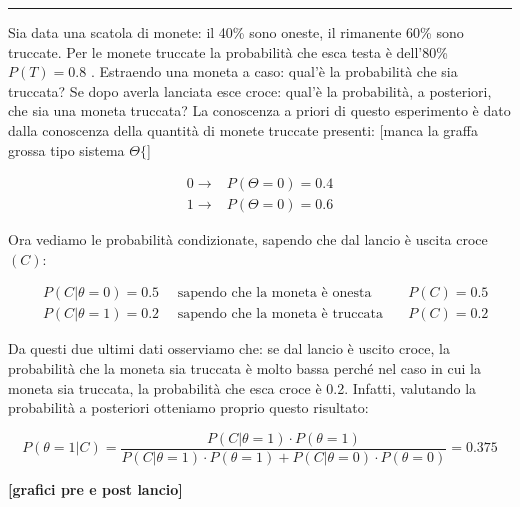 \begin{center} \rule{300pt}{1pt} \end{center}
\begin{esempio}
Sia data una scatola di monete: il 40\% sono oneste, il rimanente 60\% sono truccate. Per le monete truccate la probabilità che esca testa è dell'80\% $P(T)=0.8$ . Estraendo una moneta a caso: qual'è la probabilità che sia truccata? Se dopo averla lanciata esce croce: qual'è la probabilità, a posteriori, che sia una moneta truccata?\newline
La conoscenza a priori di questo esperimento è dato dalla conoscenza della quantità di monete truccate presenti:
[manca la graffa grossa tipo sistema $\Theta \{$]

  \begin{align*}
    0 \rightarrow &P(\Theta=0)=0.4 \\ 
    1 \rightarrow &P(\Theta=0)=0.6
  \end{align*}
  
Ora vediamo le probabilità condizionate, sapendo che dal lancio è uscita croce $(C)$:

  \begin{align*}
    &P(C|\theta=0)=0.5 \quad \text{ sapendo che la moneta è onesta}\quad &P(C)=0.5 \\
    &P(C|\theta=1)=0.2 \quad \text{ sapendo che la moneta è truccata}\quad &P(C)=0.2
  \end{align*}
  
Da questi due ultimi dati osserviamo che: se dal lancio è uscito croce, la probabilità che la moneta sia truccata è molto bassa perché nel caso in cui la moneta sia truccata, la probabilità che esca croce è 0.2. Infatti, valutando la probabilità a posteriori otteniamo proprio questo risultato:


    \[ P(\theta=1|C)=\frac{P(C|\theta=1) \cdot P(\theta=1)}{P(C|\theta=1) \cdot P(\theta=1) + P(C|\theta=0) \cdot P(\theta=0)}=0.375 \]

\textbf{[grafici pre e post lancio]}
\end{esempio}

